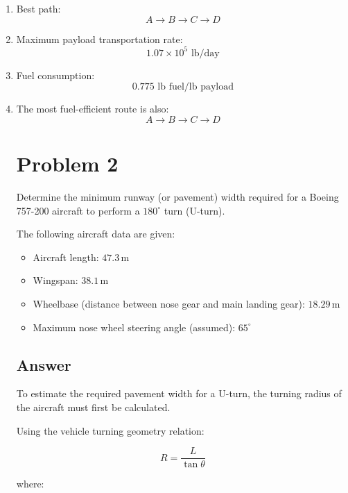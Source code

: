 \documentclass{KPS_assignment}
\begin{document}
\begin{enumerate}
    \item Best path:
    \[
    \boxed{
    A\rightarrow B\rightarrow C\rightarrow D
    }
    \]

    \item Maximum payload transportation rate:
    \[
    \boxed{
    1.07\times10^5 \text{ lb/day}
    }
    \]

    \item Fuel consumption:
    \[
    \boxed{
    0.775 \text{ lb fuel/lb payload}
    }
    \]

    \item The most fuel-efficient route is also:
    \[
    \boxed{
    A\rightarrow B\rightarrow C\rightarrow D
    }
    \]


\section*{Problem 2}

Determine the minimum runway (or pavement) width required for a Boeing 757-200 aircraft to perform a \(180^\circ\) turn (U-turn).

The following aircraft data are given:

\begin{itemize}
    \item Aircraft length: \(47.3\,\text{m}\)
    \item Wingspan: \(38.1\,\text{m}\)
    \item Wheelbase (distance between nose gear and main landing gear): \(18.29\,\text{m}\)
    \item Maximum nose wheel steering angle (assumed): \(65^\circ\)
\end{itemize}

\subsection*{Answer}

To estimate the required pavement width for a U-turn, the turning radius of the aircraft must first be calculated.

Using the vehicle turning geometry relation:

\[
R = \frac{L}{\tan \theta}
\]

where:


\end{enumerate}
\end{document}
